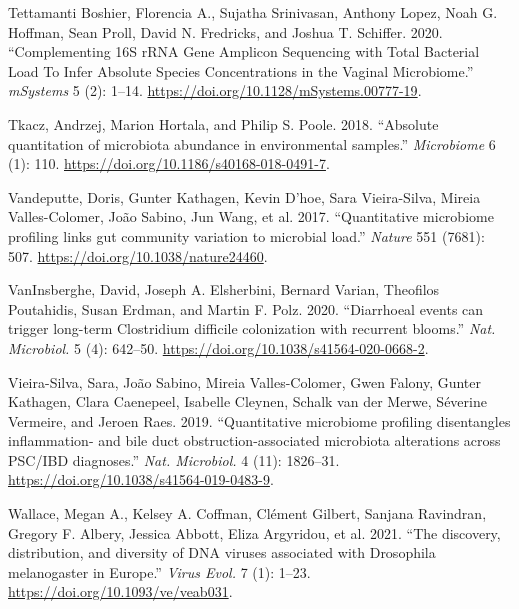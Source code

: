 \documentclass[
]{article}
\newlength{\cslhangindent}
\newlength{\cslentryspacingunit} %
\newenvironment{CSLReferences}[2] %
 {%
  \setlength{\parindent}{0pt}
  \ifodd #1
  \let\oldpar\par
  \def\par{\hangindent=\cslhangindent\oldpar}
  \fi
  \setlength{\parskip}{#2\cslentryspacingunit}
 }%
 {}
\begin{document}
\begin{CSLReferences}{1}{0}
\leavevmode{}%
Tettamanti Boshier, Florencia A., Sujatha Srinivasan, Anthony Lopez, Noah G. Hoffman, Sean Proll, David N. Fredricks, and Joshua T. Schiffer. 2020. {``{Complementing 16S rRNA Gene Amplicon Sequencing with Total Bacterial Load To Infer Absolute Species Concentrations in the Vaginal Microbiome}.''} \emph{mSystems} 5 (2): 1--14. \url{https://doi.org/10.1128/mSystems.00777-19}.

\leavevmode{}%
Tkacz, Andrzej, Marion Hortala, and Philip S. Poole. 2018. {``{Absolute quantitation of microbiota abundance in environmental samples}.''} \emph{Microbiome} 6 (1): 110. \url{https://doi.org/10.1186/s40168-018-0491-7}.

\leavevmode{}%
Vandeputte, Doris, Gunter Kathagen, Kevin D'hoe, Sara Vieira-Silva, Mireia Valles-Colomer, João Sabino, Jun Wang, et al. 2017. {``{Quantitative microbiome profiling links gut community variation to microbial load}.''} \emph{Nature} 551 (7681): 507. \url{https://doi.org/10.1038/nature24460}.

\leavevmode{}%
VanInsberghe, David, Joseph A. Elsherbini, Bernard Varian, Theofilos Poutahidis, Susan Erdman, and Martin F. Polz. 2020. {``{Diarrhoeal events can trigger long-term Clostridium difficile colonization with recurrent blooms}.''} \emph{Nat. Microbiol.} 5 (4): 642--50. \url{https://doi.org/10.1038/s41564-020-0668-2}.

\leavevmode{}%
Vieira-Silva, Sara, João Sabino, Mireia Valles-Colomer, Gwen Falony, Gunter Kathagen, Clara Caenepeel, Isabelle Cleynen, Schalk van der Merwe, Séverine Vermeire, and Jeroen Raes. 2019. {``{Quantitative microbiome profiling disentangles inflammation- and bile duct obstruction-associated microbiota alterations across PSC/IBD diagnoses}.''} \emph{Nat. Microbiol.} 4 (11): 1826--31. \url{https://doi.org/10.1038/s41564-019-0483-9}.

\leavevmode{}%
Wallace, Megan A., Kelsey A. Coffman, Clément Gilbert, Sanjana Ravindran, Gregory F. Albery, Jessica Abbott, Eliza Argyridou, et al. 2021. {``{The discovery, distribution, and diversity of DNA viruses associated with Drosophila melanogaster in Europe}.''} \emph{Virus Evol.} 7 (1): 1--23. \url{https://doi.org/10.1093/ve/veab031}.


\end{CSLReferences}
\end{document}
